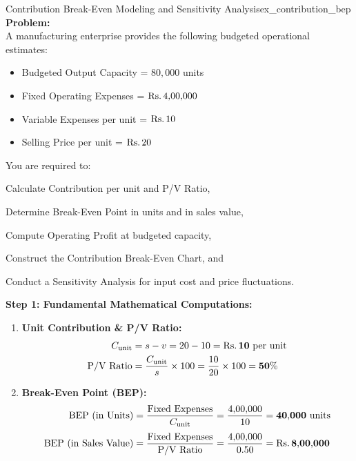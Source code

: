 \newpage
{}
\begin{example}{Contribution Break-Even Modeling and Sensitivity Analysis}{ex_contribution_bep}
\textbf{Problem:} \\
A manufacturing enterprise provides the following budgeted operational estimates:
\begin{itemize}[noitemsep]
    \item Budgeted Output Capacity = $80{,}000$ units
    \item Fixed Operating Expenses = $\text{Rs.}\, 4{,}00{,}000$
    \item Variable Expenses per unit = $\text{Rs.}\, 10$
    \item Selling Price per unit = $\text{Rs.}\, 20$
\end{itemize}
You are required to:
\begin{enumerate*}[label=(\alph*), itemjoin=\quad]
    \item Calculate Contribution per unit and P/V Ratio,
    \item Determine Break-Even Point in units and in sales value,
    \item Compute Operating Profit at budgeted capacity,
    \item Construct the Contribution Break-Even Chart, and
    \item Conduct a Sensitivity Analysis for input cost and price fluctuations.
\end{enumerate*}

\tcbline
\textbf{Step 1: Fundamental Mathematical Computations:}
\begin{enumerate}[leftmargin=*]
    \item \textbf{Unit Contribution \& P/V Ratio:}
    \begin{align*}
        C_{\text{unit}} &= s - v = 20 - 10 = \mathbf{\text{Rs.}\, 10 \text{ per unit}} \\
        \text{P/V Ratio} &= \frac{C_{\text{unit}}}{s} \times 100 = \frac{10}{20} \times 100 = \mathbf{50\%}
    \end{align*}

    \item \textbf{Break-Even Point (BEP):}
    \begin{align*}
        \text{BEP (in Units)} &= \frac{\text{Fixed Expenses}}{C_{\text{unit}}} = \frac{4{,}00{,}000}{10} = \mathbf{40{,}000 \text{ units}} \\[0.3em]
        \text{BEP (in Sales Value)} &= \frac{\text{Fixed Expenses}}{\text{P/V Ratio}} = \frac{4{,}00{,}000}{0.50} = \mathbf{\text{Rs.}\, 8{,}00{,}000}
    \end{align*}


\end{enumerate}
\end{example}
